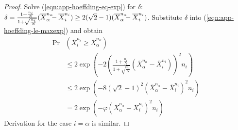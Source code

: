 \documentclass[]{article}
\begin{document}
\begin{proof}
Solve (\ref{eqn:app-hoeffding-eq-exp}) for $\delta$: $\delta=\frac {1+\frac {n_i} N} {1+\sqrt {\frac {n_i} N}} (\overline X_\alpha^{n_\alpha}\hspace{-0.5em}
- \overline X_i^{n_i}) \ge 2(\sqrt 2 - 1)(\overline X_\alpha^{n_\alpha}\hspace{-0.5em}-\overline X_i^{n_i})$. Substitute $\delta$ into 
(\ref{eqn:app-hoeffding-le-maxexp}) and obtain
\begin{align}
\Pr&(\overline X_i^{n_i}\ge \overline X_\alpha^{n_\alpha}) \nonumber\\
& \le 2\exp\left(-2\left( \frac {1+\frac {n_i} N} {1+\sqrt {\frac {n_i} N}}
                          (\overline X_\alpha^{n_\alpha} - \overline X_i^{n_i})\right)^2 n_i\right)\nonumber \\
& \le 2\exp(-8(\sqrt 2 - 1)^2(\overline X_\alpha^{n_\alpha} - \overline X_i^{n_i})^2n_i)\nonumber\\
& = 2\exp(-\varphi(\overline X_\alpha^{n_\alpha} - \overline X_i^{n_i})^2n_i)
\end{align}
Derivation for the case $i=\alpha$ is similar.
\end{proof}
\end{document}
